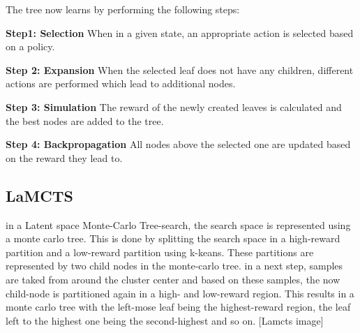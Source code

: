 \documentclass[bibliography=totoc]{scrartcl}
\begin{document}

The tree now learns by performing the following steps:

\textbf{Step1: Selection} When in a given state, an appropriate action is selected based on a policy.

\textbf{Step 2: Expansion} When the selected leaf does not have any children, different actions are performed which lead to additional nodes.

\textbf{Step 3: Simulation} The reward of the newly created leaves is calculated and the best nodes are added to the tree.

\textbf{Step 4: Backpropagation} All nodes above the selected one are updated based on the reward they lead to.

\subsection{LaMCTS}
in a Latent space Monte-Carlo Tree-search, the search space is represented using a monte carlo tree. This is done by splitting the search space in a high-reward partition and a low-reward partition using k-keans. These partitions are represented by two child nodes in the monte-carlo tree. in a next step, samples are taked from around the cluster center and based on these samples, the now child-node is partitioned again in a high- and low-reward region. This results in a monte carlo tree with the left-mose leaf being the highest-reward region, the leaf left to the highest one being the second-highest and so on.
[Lamcts image]
\end{document}
